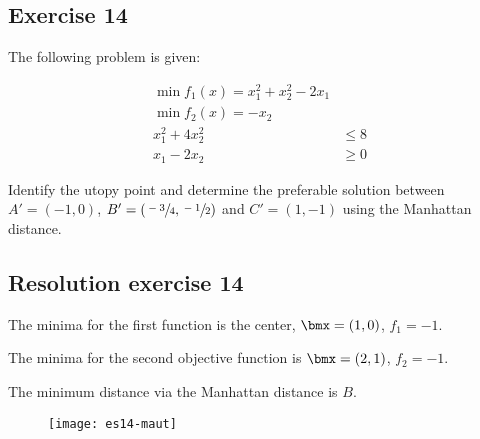 \documentclass[\main/main.tex]{subfiles}
\begin{document}
\subsection{Exercise 14}
The following problem is given:

\begin{align*}
  \min f_1(x) = x_1^2 + x_2^2 - 2x_1 \\
  \min f_2(x) = -x_2                 \\
  x_1^2 + 4x^2_2 & \leq 8            \\
  x_1 - 2x_2     & \geq 0
\end{align*}


Identify the utopy point and determine the preferable solution between $A' = (-1,0)$, $B'=(\sfrac{-3}{4}, \sfrac{-1}{2})$ and $C' = (1, -1)$ using the Manhattan distance.

\subsection{Resolution exercise 14}
The minima for the first function is the center, $\bmx = (1,0)$, $f_1 = -1$.

The minima for the second objective function is $\bmx=(2,1)$, $f_2 = -1$.

The minimum distance via the Manhattan distance is $B$.

\begin{figure}
  \texttt{[image: es14-maut]}
\end{figure}
\end{document}
